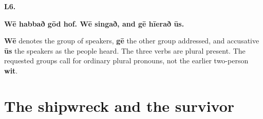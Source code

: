 \par\begin{minipage}{\linewidth}\raggedright
\textbf{L6.}

\textbf{Wē habbað gōd hof. Wē singað, and gē hīerað ūs.}

\textbf{Wē} denotes the group of speakers, \textbf{gē} the other group addressed, and accusative \textbf{ūs} the speakers as the people heard. The three verbs are plural present. The requested groups call for ordinary plural pronouns, not the earlier two-person \textbf{wit}.

\end{minipage}\par\addvspace{4pt}

\section*{The shipwreck and the survivor}

